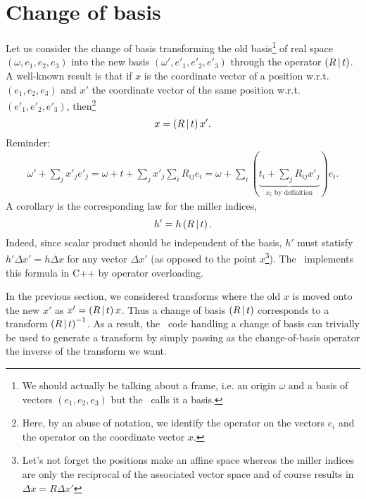 \documentclass[11pt]{article}
\begin{document}
\section{Change of basis}

Let us consider the change of basis transforming the old basis\footnote{We should actually be talking about a frame, i.e. an origin $\omega$ and a basis of vectors $(e_1, e_2, e_3)$ but the \cctbx\ calls it a basis.} of real space $(\omega, e_1, e_2, e_3)$ into the new basis $(\omega', e'_1, e'_2, e'_3)$ through the operator $\left( R\,\vert\, t \right)$. A well-known result is that if $x$ is the coordinate vector of a position w.r.t. $(e_1, e_2, e_3)$ and $x'$ the coordinate vector of the same position w.r.t. $(e'_1, e'_2, e'_3)$, then\footnote{Here, by an abuse of notation, we identify the operator on the vectors $e_i$ and the operator on the coordinate vector $x$.}
\begin{equation}
x = \left( R\,\vert\, t \right)x'.
\label{change::of::basis::position}
\end{equation}
Reminder:
\begin{align}
\omega' + \sum_j x'_j e'_j = \omega + t + \sum_j x'_j \sum_i R_{ij} e_i = \omega + \sum_i (\underbrace{t_i + \sum_j R_{ij} x'_j}_{x_i \text{ by definition}})e_i. \nonumber
\end{align}
A corollary is the corresponding law for the miller indices,
\begin{equation}
h' = h\left( R\,\vert\, t \right).
\end{equation}
Indeed, since scalar product should be independent of the basis, $h'$ must statisfy $h'\Delta x' = h\Delta x$ for any vector $\Delta x'$ (as opposed to the point $x$\footnote{Let's not forget the positions make an affine space whereas the miller indices are only the reciprocal of the associated vector space and of course  results in $\Delta x = R \Delta x'$}). The \cctbx\ implements this formula in C++ by operator overloading.

In the previous section, we considered transforms where the old $x$ is moved onto the new $x'$ as $x' = \left( R\,\vert\, t \right) x$. Thus a change of basis $\left( R\,\vert\, t \right)$ corresponds to a transform $\left( R\,\vert\, t \right)^{-1}$. As a result, the \cctbx\ code handling a change of basis can trivially be used to generate a transform by simply passing as the change-of-basis operator the inverse of the transform we want.
\end{document}
